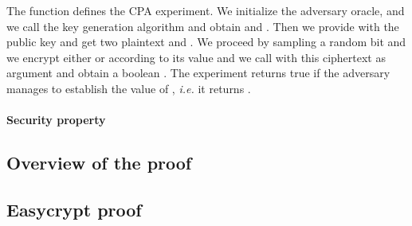 The function  defines the CPA experiment. We initialize the
adversary oracle, and we call the key generation algorithm and obtain
 and . Then we provide  with the public key and get
two plaintext  and . We proceed by sampling a random bit
and we encrypt either  or  according to its value and we
call  with this ciphertext as argument and obtain a boolean
. The experiment returns true if the adversary manages to
establish the value of , {\em i.e.} it returns .

\paragraph{Security property}
\subsection{Overview of the proof}

\subsection{Easycrypt proof}


